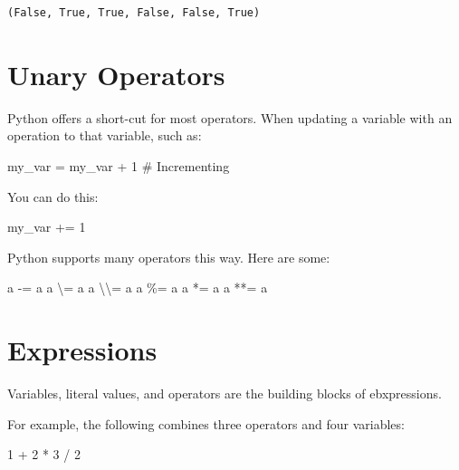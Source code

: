 \documentclass[
  letterpaper,
  DIV=11,
  numbers=noendperiod]{scrreprt}
\newenvironment{Shaded}{\begin{snugshade}}{\end{snugshade}}
\newcommand{\CommentTok}[1]{\textcolor[rgb]{0.37,0.37,0.37}{#1}}
\newcommand{\DecValTok}[1]{\textcolor[rgb]{0.68,0.00,0.00}{#1}}
\newcommand{\NormalTok}[1]{\textcolor[rgb]{0.00,0.23,0.31}{#1}}
\newcommand{\OperatorTok}[1]{\textcolor[rgb]{0.37,0.37,0.37}{#1}}
\begin{document}
\begin{verbatim}
(False, True, True, False, False, True)
\end{verbatim}

\hypertarget{unary-operators}{%
\chapter{Unary Operators}\label{unary-operators}}

Python offers a short-cut for most operators. When updating a variable
with an operation to that variable, such as:

\begin{Shaded}
\begin{Highlighting}[]
\NormalTok{my\_var }\OperatorTok{=}\NormalTok{ my\_var }\OperatorTok{+} \DecValTok{1}  \CommentTok{\# Incrementing}
\end{Highlighting}
\end{Shaded}

You can do this:

\begin{Shaded}
\begin{Highlighting}[]
\NormalTok{my\_var }\OperatorTok{+=} \DecValTok{1}
\end{Highlighting}
\end{Shaded}

Python supports many operators this way. Here are some:

\begin{Shaded}
\begin{Highlighting}[]
\NormalTok{a }\OperatorTok{{-}=}\NormalTok{ a}
\NormalTok{a \textbackslash{}}\OperatorTok{=}\NormalTok{ a}
\NormalTok{a \textbackslash{}\textbackslash{}}\OperatorTok{=}\NormalTok{ a}
\NormalTok{a }\OperatorTok{\%=}\NormalTok{ a}
\NormalTok{a }\OperatorTok{*=}\NormalTok{ a}
\NormalTok{a }\OperatorTok{**=}\NormalTok{ a}
\end{Highlighting}
\end{Shaded}

\hypertarget{expressions}{%
\chapter{Expressions}\label{expressions}}

Variables, literal values, and operators are the building blocks of
ebxpressions.

For example, the following combines three operators and four variables:

\begin{Shaded}
\begin{Highlighting}[]
\DecValTok{1} \OperatorTok{+} \DecValTok{2} \OperatorTok{*} \DecValTok{3} \OperatorTok{/} \DecValTok{2}
\end{Highlighting}
\end{Shaded}
\end{document}
